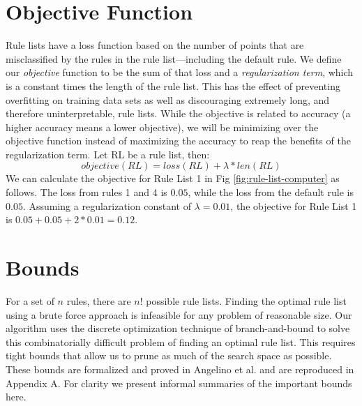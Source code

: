 \section{Objective Function}
Rule lists have a loss function based on the number of points that are misclassified by the rules in the rule list---including the default rule.
We define our \textit{objective} function to be the sum of that loss and a \textit{regularization term}, which is a constant times the length of the rule list.
This has the effect of preventing overfitting on training data sets as well as discouraging extremely long, and therefore uninterpretable, rule lists.
While the objective is related to accuracy (a higher accuracy means a lower objective), we will be minimizing over the objective function instead of maximizing the accuracy to reap the benefits of the regularization term.
Let RL be a rule list, then:
$$objective(RL) = loss(RL) + \lambda * len(RL)$$
We can calculate the objective for Rule List 1 in Fig \ref{fig:rule-list-computer} as follows.
The loss from rules 1 and 4 is $0.05$, while the loss from the default rule is $0.05$.
Assuming a regularization constant of $\lambda=0.01$, the objective for Rule List  1 is $0.05 + 0.05 + 2 * 0.01 = 0.12$.

\section{Bounds}\label{sec:bounds}
For a set of $n$ rules, there are $n!$ possible rule lists.
Finding the optimal rule list using a brute force approach is infeasible for any problem of reasonable size.
Our algorithm uses the discrete optimization technique of branch-and-bound to solve this combinatorially difficult problem of finding an optimal rule list.
This requires tight bounds that allow us to prune as much of the search space as possible.
These bounds are formalized and proved in Angelino et al. \cite{AngelinoLaAlSeRu17} and are reproduced in Appendix A.
For clarity we present informal summaries of the important bounds here.

